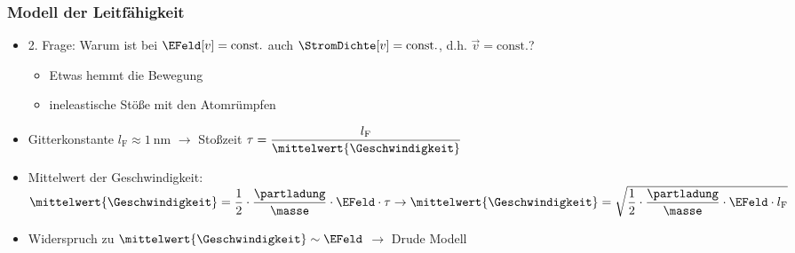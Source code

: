 \begin{frame}
  \frametitle{Modell der Leitfähigkeit}
\begin{itemize}[<+->]      
\item 2. Frage: Warum ist bei $\EFeld[v] = \text{const.}$ auch $\StromDichte[v] = \text{const.}$, d.h. $\vec{v} = \text{const.}$?
  \begin{itemize}[<+->]
  \item Etwas hemmt die Bewegung
  \item ineleastische Stöße mit den Atomrümpfen
    \end{itemize} 
\item Gitterkonstante \(l_\mathrm{F} \approx \SI{1}{\nano\metre} \) $\to$ Stoßzeit $
	\tau = \dfrac{l_\mathrm{F}}{\mittelwert{\Geschwindigkeit}}$

	\centerline{}

\item Mittelwert der Geschwindigkeit: $\mittelwert{\Geschwindigkeit} = \dfrac{1}{2} \cdot \dfrac{\partladung}{\masse} \cdot \EFeld \cdot \tau \to
\mittelwert{\Geschwindigkeit} =  \sqrt{\dfrac{1}{2} \cdot \dfrac{\partladung}{\masse} \cdot \EFeld \cdot l_\mathrm{F}}$
\item \alert{Widerspruch} zu \(\mittelwert{\Geschwindigkeit} \sim \EFeld \) $\to$ \alert{Drude Modell}
  \end{itemize}

  
\end{frame}


